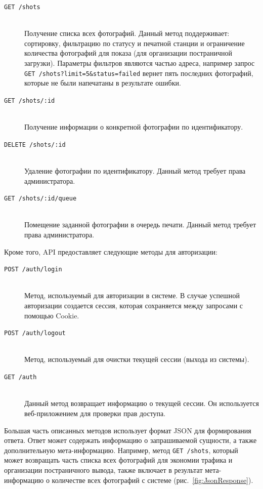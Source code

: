 \documentclass[a4paper,14pt,href,draft]{article}
\begin{document}
\begin{description}
  \item[\texttt{GET /shots}] \hfill\\Получение списка всех фотографий. Данный метод поддерживает: сортировку, фильтрацию по
    статусу и печатной станции и ограничение количества фотографий для показа (для организации
    постраничной загрузки). Параметры фильтров являются частью адреса, например запрос \texttt{GET /shots?limit=5\&status=failed}
    вернет пять последних фотографий, которые не были напечатаны в результате ошибки.

  \item[\texttt{GET /shots/:id}] \hfill\\Получение информации о конкретной фотографии по идентификатору.
  \item[\texttt{DELETE /shots/:id}] \hfill\\Удаление фотографии по идентификатору. Данный метод требует права
    администратора.
  \item[\texttt{GET /shots/:id/queue}] \hfill\\Помещение заданной фотографии в очередь печати. Данный метод требует права
    администратора.
\end{description}

Кроме того, API предоставляет следующие методы для авторизации:
\begin{description}
  \item[\texttt{POST /auth/login}] \hfill\\Метод, используемый для авторизации в системе. В случае успешной авторизации создается
    сессия, которая сохраняется между запросами с помощью Cookie.

  \item[\texttt{POST /auth/logout}] \hfill\\Метод, используемый для очистки текущей сессии (выхода из системы).

  \item[\texttt{GET /auth}] \hfill\\Данный метод возвращает информацию о текущей сессии. Он используется веб-приложением для
    проверки прав доступа.
\end{description}

Большая часть описанных методов использует формат JSON для формирования ответа. Ответ может содержать информацию о
запрашиваемой сущности, а также дополнительную мета-информацию. Например, метод \texttt{GET /shots}, который может
возвращать часть списка всех фотографий для экономии трафика и организации постраничного вывода, также включает в результат
мета-информацию о количестве всех фотографий с системе (рис.~\ref{fig:JsonResponse}).
\end{document}
